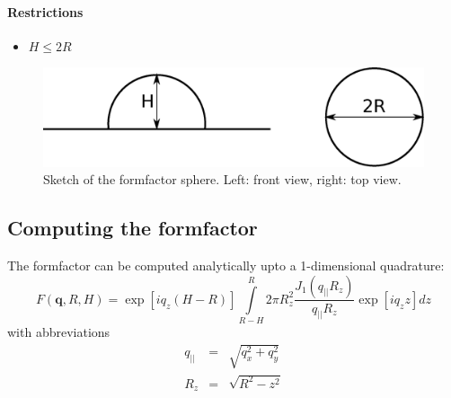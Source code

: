 \paragraph{Restrictions}
\begin{itemize}
\item $H\leq 2R$
\end{itemize}


\par
\begin{figure}[!h]
\begin{center}
\includegraphics[width=0.6\columnwidth]{Figures/sphere}
\caption{Sketch of the formfactor sphere. Left: front view, right: top view.}
\end{center}
\label{sphere}
\end{figure}

\subsection{Computing the formfactor}
The formfactor can be computed analytically upto a 1-dimensional quadrature:
\begin{equation}
F(\mathbf q, R, H) = \exp\left[iq_z\left(H-R\right)\right]\int\limits_{R-H}^{R}{2\pi R_z^2\frac{J_1(q_{||}R_z)}{q_{||}R_z}\exp\left[iq_zz\right]dz} 
\label{eq:ffsphere}
\end{equation}
with abbreviations
\begin{eqnarray}
q_{||} &=& \sqrt{q_x^2+q_y^2} \\
R_z &=& \sqrt{R^2-z^2} 
\end{eqnarray}

